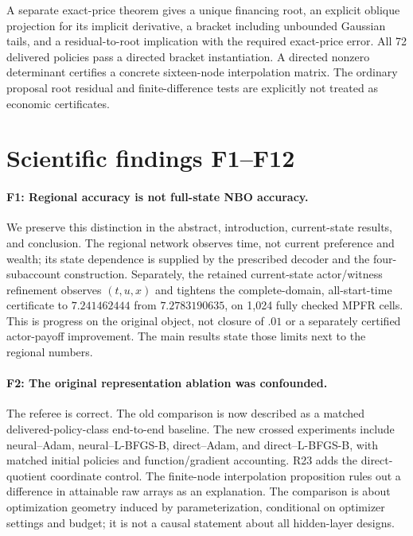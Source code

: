 A separate exact-price theorem gives a unique financing root, an explicit oblique projection for its implicit derivative, a bracket including unbounded Gaussian tails, and a residual-to-root implication with the required exact-price error. All 72 delivered policies pass a directed bracket instantiation. A directed nonzero determinant certifies a concrete sixteen-node interpolation matrix. The ordinary proposal root residual and finite-difference tests are explicitly not treated as economic certificates.

\section{Scientific findings F1--F12}
\paragraph{F1: Regional accuracy is not full-state NBO accuracy.}
We preserve this distinction in the abstract, introduction, current-state results, and conclusion. The regional network observes time, not current preference and wealth; its state dependence is supplied by the prescribed decoder and the four-subaccount construction. Separately, the retained current-state actor/witness refinement observes $(t,u,x)$ and tightens the complete-domain, all-start-time certificate to $7.241462444$ from $7.2783190635$, on 1,024 fully checked MPFR cells. This is progress on the original object, not closure of $.01$ or a separately certified actor-payoff improvement. The main results state those limits next to the regional numbers.

\paragraph{F2: The original representation ablation was confounded.}
The referee is correct. The old comparison is now described as a matched delivered-policy-class end-to-end baseline. The new crossed experiments include neural--Adam, neural--L-BFGS-B, direct--Adam, and direct--L-BFGS-B, with matched initial policies and function/gradient accounting. R23 adds the direct-quotient coordinate control. The finite-node interpolation proposition rules out a difference in attainable raw arrays as an explanation. The comparison is about optimization geometry induced by parameterization, conditional on optimizer settings and budget; it is not a causal statement about all hidden-layer designs.

